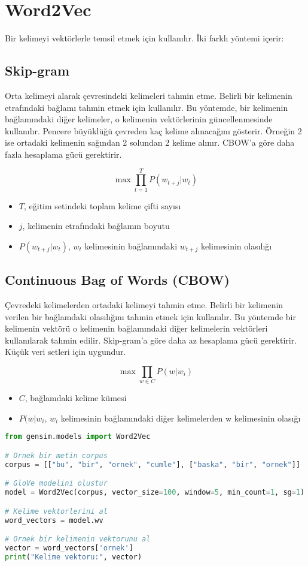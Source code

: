 \section{Word2Vec}
Bir kelimeyi vektörlerle temsil etmek için kullanılır. İki farklı yöntemi içerir:

\subsection{Skip-gram}
Orta kelimeyi alarak çevresindeki kelimeleri tahmin etme. Belirli bir kelimenin etrafındaki bağlamı tahmin etmek için kullanılır. Bu yöntemde, bir kelimenin bağlamındaki diğer kelimeler, o kelimenin vektörlerinin güncellenmesinde kullanılır. Pencere büyüklüğü çevreden kaç kelime alınacağını gösterir. Örneğin 2 ise ortadaki kelimenin sağından 2 solundan 2 kelime alınır. CBOW'a göre daha fazla hesaplama gücü gerektirir. 

\[\max \prod_{t=1}^{T} P(w_{t+j} | w_t)\]
\begin{itemize}
    \item $T$, eğitim setindeki toplam kelime çifti sayısı
    \item $j$, kelimenin etrafındaki bağlamın boyutu
    \item $P(w_{t+j} | w_{t})$, $w_{t}$ kelimesinin bağlamındaki $w_{t+j}$ kelimesinin olasılığı
\end{itemize}

\subsection{Continuous Bag of Words (CBOW)}
Çevredeki kelimelerden ortadaki kelimeyi tahmin etme. Belirli bir kelimenin verilen bir bağlamdaki olasılığını tahmin etmek için kullanılır. Bu yöntemde bir kelimenin vektörü o kelimenin bağlamındaki diğer kelimelerin vektörleri kullanılarak tahmin edilir. Skip-gram'a göre daha az hesaplama gücü gerektirir. Küçük veri setleri için uygundur.

\[\max \prod_{w \in C} P(w | w_i)\]
\begin{itemize}
    \item $C$, bağlamdaki kelime kümesi
    \item $P(w | w_{i}$, $w_{i}$ kelimesinin bağlamındaki diğer kelimelerden w kelimesinin olasığı
\end{itemize}

\begin{lstlisting}[language=Python]
from gensim.models import Word2Vec

# Ornek bir metin corpus
corpus = [["bu", "bir", "ornek", "cumle"], ["baska", "bir", "ornek"]]

# GloVe modelini olustur
model = Word2Vec(corpus, vector_size=100, window=5, min_count=1, sg=1)

# Kelime vektorlerini al
word_vectors = model.wv

# Ornek bir kelimenin vektorunu al
vector = word_vectors['ornek']
print("Kelime vektoru:", vector)
\end{lstlisting}

\newpage